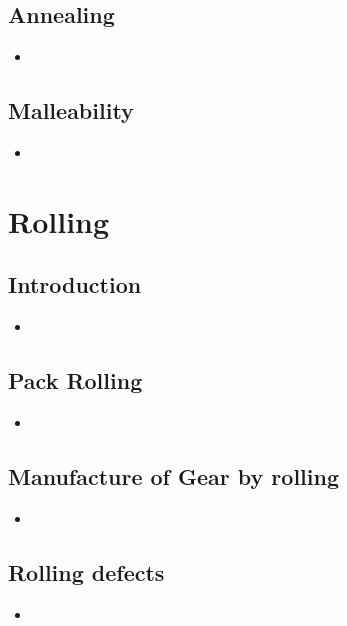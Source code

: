 \documentclass[8pt]{report}
\begin{document}
\section{Annealing}
	\begin{itemize}
		\item
	\end{itemize}\hrulefill
\section{Malleability}
	\begin{itemize}
		\item
	\end{itemize}\hrulefill
\chapter{Rolling}
\section{Introduction}
	\begin{itemize}
		\item
	\end{itemize}\hrulefill
\section{Pack Rolling}
	\begin{itemize}
		\item
	\end{itemize}\hrulefill
\section{Manufacture of Gear by rolling}
	\begin{itemize}
		\item
	\end{itemize}\hrulefill
\section{Rolling defects}
	\begin{itemize}
		\item
	\end{itemize}\hrulefill
\end{document}
